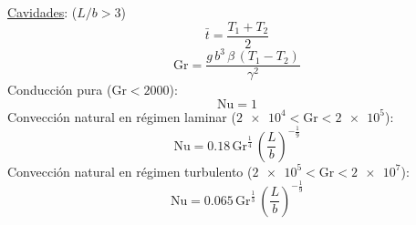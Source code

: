 \documentclass[letter,oneside,10pt]{article}
\begin{document}
\begin{multicols}{3}
\underline{Cavidades}: ($L/b>3$)
\vspace{-0.3cm}
\begin{equation*}
    \bar{t} = \frac{T_1 + T_2}{2}
\end{equation*}
\vspace{-0.3cm}
\begin{equation*}
    \text{Gr} = \frac{g\,b^3\,\beta\,(T_1 - T_2)}{\gamma^2}
\end{equation*}
Conducción pura ($\text{Gr}<2000$):
\vspace{-0.3cm}
\begin{equation*}
    \text{Nu} = 1
\end{equation*}
Convección natural en régimen laminar ($\num{2e4} < \text{Gr} < \num{2e5}$):
\vspace{-0.3cm}
\begin{equation*}
    \text{Nu} = 0.18\,\text{Gr}^{\frac{1}{4}}\,
    \left(\frac{L}{b}\right)^{-\frac{1}{9}}
\end{equation*}
Convección natural en régimen turbulento ($\num{2e5} < \text{Gr} < \num{2e7}$):
\vspace{-0.3cm}
\begin{equation*}
    \text{Nu} = 0.065\,\text{Gr}^{\frac{1}{3}}\,
    \left(\frac{L}{b}\right)^{-\frac{1}{9}}
\end{equation*}

\vspace{-0.5cm}

\end{multicols}
\end{document}
